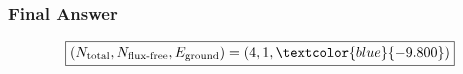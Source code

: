 \subsubsection*{Final Answer}

\[
\boxed{
\left(N_{\mathrm{total}},N_{\mathrm{flux\text{-}free}},E_{\mathrm{ground}}\right)
=\left(4,1,\textcolor{blue}{-9.800}\right)
}
\]
